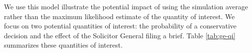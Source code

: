 \documentclass[10pt]{article}
\begin{document}

We use this model illustrate the potential impact of using the simulation average rather than the maximum likelihood estimate of the quantity of interest. 
We focus on two potential quantities of interest: the probability of a conservative decision and the effect of the Solicitor General filing a brief. 
Table \ref{tab:ge-qi} summarizes these quantities of interest. 
\end{document}
